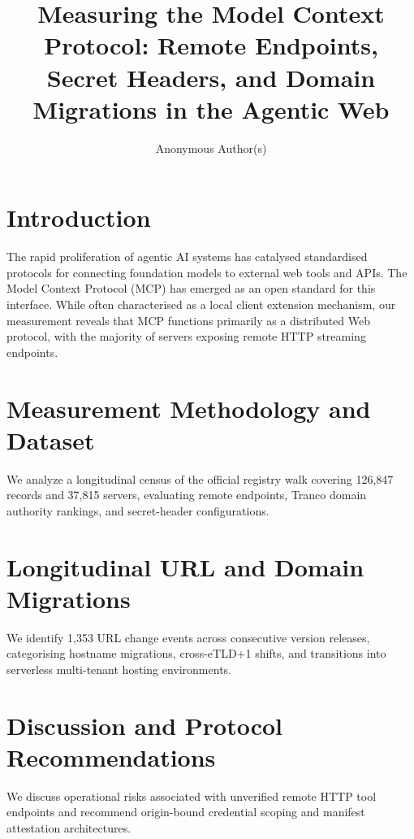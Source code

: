 \documentclass[sigconf,anonymous,review]{acmart}
\title{Measuring the Model Context Protocol: Remote Endpoints, Secret Headers, and Domain Migrations in the Agentic Web}
\author{Anonymous Author(s)}
\affiliation{%
  \institution{Anonymous Institution}
  \country{Anonymous Country}
}
\begin{document}
\maketitle

\section{Introduction}
The rapid proliferation of agentic AI systems has catalysed standardised protocols for connecting foundation models to external web tools and APIs. The Model Context Protocol (MCP) has emerged as an open standard for this interface. While often characterised as a local client extension mechanism, our measurement reveals that MCP functions primarily as a distributed Web protocol, with the majority of servers exposing remote HTTP streaming endpoints.

\section{Measurement Methodology and Dataset}
We analyze a longitudinal census of the official registry walk covering 126,847 records and 37,815 servers, evaluating remote endpoints, Tranco domain authority rankings, and secret-header configurations.

\section{Longitudinal URL and Domain Migrations}
We identify 1,353 URL change events across consecutive version releases, categorising hostname migrations, cross-eTLD+1 shifts, and transitions into serverless multi-tenant hosting environments.

\section{Discussion and Protocol Recommendations}
We discuss operational risks associated with unverified remote HTTP tool endpoints and recommend origin-bound credential scoping and manifest attestation architectures.



\end{document}
